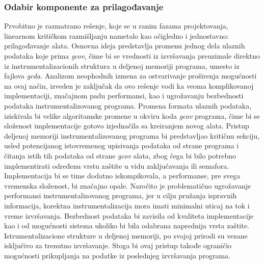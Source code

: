 \documentclass[12pt,oneside]{memoir}
\newcommand{\strano}[1]{\textit{#1}}
\begin{document}
\subsubsection{Odabir komponente za prilagođavanje}


Prvobitno je razmatrano rešenje, koje se u ranim fazama projektovanja, linearnom kritičkom razmišljanju nametalo kao očigledno i jednostavno: prilagođavanje alata. Osnovna ideja predstavlja promenu jednog dela ulaznih podataka koje prima \strano{gcov}, čime bi se vrednosti iz izvršavanja preuzimale direktno iz instrumentalizacionih struktura u deljenoj memoriji programa, umesto iz fajlova \strano{gcda}. Analizom neophodnih izmena za ostvarivanje proširenja mogućnosti na ovaj način, izveden je zaključak da ovo rešenje vodi ka veoma komplikovanoj implementaciji, značajnom padu performansi, kao i ugrožavanju bezbednosti podataka instrumentalizovanog programa. Promena formata ulaznih podataka, iziskivala bi velike algoritamske promene u okviru koda \strano{gcov} programa, čime bi se složenost implementacije gotovo izjednačila sa kreiranjem novog alata. Pristup deljenoj memoriji instrumentalizovanog programa bi predstavljao kritičnu sekciju, usled potencijanog istovremenog upisivanja podataka od strane programa i čitanja istih tih podataka od strane \strano{gcov} alata, zbog čega bi bilo potrebno implementirati određenu vrstu zaštite u vidu zaključavanja ili semafora. Implementacija bi se time dodatno iskompikovala, a performanse, pre svega vremenska složenost, bi značajno opale. Naročito je problematično ugrožavanje performansi instrumentalizovanog programa, jer u cilju pružanja ispravnih informacija, korektna instrumentalizacija mora imati minimalni uticaj na tok i vreme izvršavanja. Bezbednost podataka bi zavisila od kvaliteta implementacije kao i od mogućnosti sistema ukoliko bi bila odabrana naprednija vrsta zaštite. Istrumentalizacione strukture u deljenoj memoriji, po svojoj prirodi su vezane isključivo za trenutno izvršavanje. Stoga bi ovaj pristup takođe ograničio mogućnosti prikupljanja na podatke iz poslednjeg izvršavanja programa. 
\end{document}
